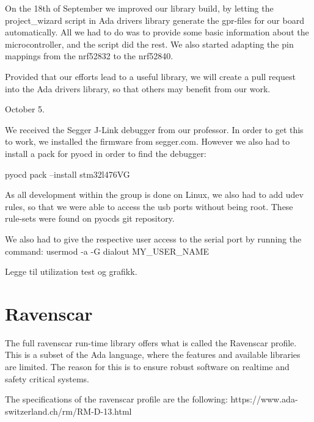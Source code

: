 \documentclass{article}
\begin{document}

\vspace{5mm}
On the 18th of September we improved our library build, by letting the project\_wizard script in Ada drivers library generate the gpr-files for our board automatically. All we had to do was to provide some basic information about the microcontroller, and the script did the rest. We also started adapting the pin mappings from the nrf52832 to the nrf52840. 

Provided that our efforts lead to a useful library, we will create a pull request into the Ada drivers library, so that others may benefit from our work. 


\vspace{5mm}

October 5. 

We received the Segger J-Link debugger from our professor. In order to get this to work, we installed the firmware from segger.com. However we also had to install a pack for pyocd in order to find the debugger:

pyocd pack --install  stm32l476VG

As all development within the group is done on Linux, we also had to add udev rules, so that we were able to access the usb ports without being root. These rule-sets were found on pyocds git repository.

We also had to give the respective user access to the serial port by running the command: 
usermod -a -G dialout MY\_USER\_NAME


Legge til utilization test og grafikk.

\section{Ravenscar}

The full ravenscar run-time library offers what is called the Ravenscar profile. This is a subset of the Ada language, where the features and available libraries are limited. The reason for this is to ensure robust software on realtime and safety critical systems. 

The specifications of the ravenscar profile are the following:
https://www.ada-switzerland.ch/rm/RM-D-13.html
\end{document}
